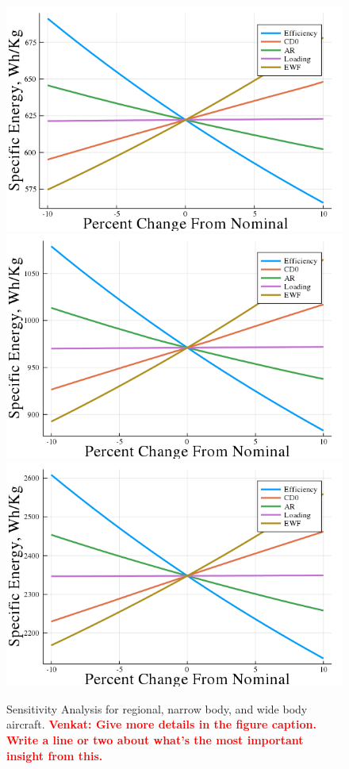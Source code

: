 \documentclass{achemso}
\newcommand{\vv}[1]{{\textbf{\textcolor{red}{Venkat: #1}}}}
\begin{document}
\begin{figure}[htp]

\centering
\includegraphics[width=.3\textwidth]{Figures/RJ_Sensitivity.png}\hfill
\includegraphics[width=.3\textwidth]{Figures/NB_Sensitivity.png}\hfill
\includegraphics[width=.3\textwidth]{Figures/WB_Sensitivity.png}

\caption{Sensitivity Analysis for regional, narrow body, and wide body aircraft.  \vv{Give more details in the figure caption.  Write a line or two about what's the most important insight from this.}}
\label{fig:sensitivity}

\end{figure}
\end{document}
